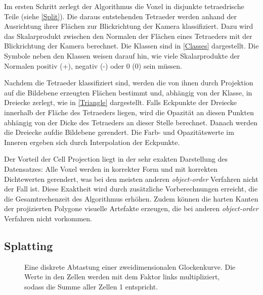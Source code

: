 \documentclass[a4paper,fontsize=12pt,toc=bib,parskip=half,ngerman]{scrartcl}
\begin{document}
Im ersten Schritt zerlegt der Algorithmus die Voxel in disjunkte tetraedrische Teile (siehe \cref{Split}). Die daraus entstehenden Tetraeder werden anhand der Ausrichtung ihrer Fl\"achen zur Blickrichtung der Kamera klassifiziert. Dazu wird das Skalarprodukt zwischen den Normalen der Fl\"achen eines Tetraeders mit der Blickrichtung der Kamera berechnet. Die Klassen sind in \cref{Classes} dargestellt. Die Symbole neben den Klassen weisen darauf hin, wie viele Skalarprodukte der Normalen positiv (+), negativ (-) oder 0 (0) sein m\"ussen.

Nachdem die Tetraeder klassifiziert sind, werden die von ihnen durch Projektion auf die Bildebene erzeugten Fl\"achen bestimmt und, abh\"angig von der Klasse, in Dreiecke zerlegt, wie in \cref{Triangle} dargestellt. Falls Eckpunkte der Dreiecke innerhalb der Fl\"ache des Tetraeders liegen, wird die Opazit\"at an diesen Punkten abh\"angig von der Dicke des Tetraeders an dieser Stelle berechnet. Danach werden die Dreiecke aufdie Bildebene gerendert. Die Farb- und Opazit\"atswerte im Inneren ergeben sich durch Interpolation der Eckpunkte.

Der Vorteil der Cell Projection liegt in der sehr exakten Darstellung des Datensatzes: Alle Voxel werden in korrekter Form und mit korrekten Dichtewerten gerendert, was bei den meisten anderen \textit{object-order} Verfahren nicht der Fall ist. Diese Exaktheit wird durch zus\"atzliche Vorberechnungen erreicht, die die Gesamtrechenzeit des Algorithmus erh\"ohen. Zudem k\"onnen die harten Kanten der projizierten Polygone visuelle Artefakte erzeugen, die bei anderen \textit{object-order} Verfahren nicht vorkommen.

\subsection{Splatting}

\begin{figure}
	\centering
	\caption{Eine diskrete Abtastung einer zweidimensionalen Glockenkurve. Die Werte in den Zellen werden mit dem Faktor links multipliziert, sodass die Summe aller Zellen 1 entspricht.}
	\label{kernel}
\end{figure}
\end{document}
